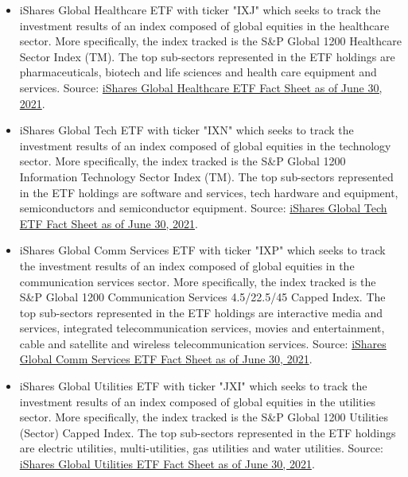 \begin{itemize}
        \item iShares Global Healthcare ETF with ticker "IXJ" which seeks to track the investment results of an index composed of global equities in the healthcare sector. More specifically, the index tracked is the S{\&}P Global 1200 Healthcare Sector Index (TM). The top sub-sectors represented in the ETF holdings are pharmaceuticals, biotech and life sciences and health care equipment and services. Source: \href{https://www.ishares.com/us/literature/fact-sheet/ixj-ishares-global-healthcare-etf-fund-fact-sheet-en-us.pdf}{iShares Global Healthcare ETF Fact Sheet as of June 30, 2021}.%
        
        \item iShares Global Tech ETF with ticker "IXN" which seeks to track the investment results of an index composed of global equities in the technology sector. More specifically, the index tracked is the S{\&}P Global 1200 Information Technology Sector Index (TM). The top sub-sectors represented in the ETF holdings are software and services, tech hardware and equipment, semiconductors and semiconductor equipment. Source: \href{https://www.ishares.com/us/literature/fact-sheet/ixn-ishares-global-tech-etf-fund-fact-sheet-en-us.pdf}{iShares Global Tech ETF Fact Sheet as of June 30, 2021}.%
        
        \item iShares Global Comm Services ETF with ticker "IXP" which seeks to track the investment results of an index composed of global equities in the communication services sector. More specifically, the index tracked is the S{\&}P Global 1200 Communication Services 4.5/22.5/45 Capped Index. The top sub-sectors represented in the ETF holdings are interactive media and services, integrated telecommunication services, movies and entertainment, cable and satellite and wireless telecommunication services. Source: \href{https://www.ishares.com/us/literature/fact-sheet/ixp-ishares-global-comm-services-etf-fund-fact-sheet-en-us.pdf}{iShares Global Comm Services ETF Fact Sheet as of June 30, 2021}.%
        
        \item iShares Global Utilities ETF with ticker "JXI" which seeks to track the investment results of an index composed of global equities in the utilities sector. More specifically, the index tracked is the S{\&}P Global 1200 Utilities (Sector) Capped Index. The top sub-sectors represented in the ETF holdings are electric utilities, multi-utilities, gas utilities and water utilities. Source: \href{https://www.ishares.com/us/literature/fact-sheet/jxi-ishares-global-utilities-etf-fund-fact-sheet-en-us.pdf}{iShares Global Utilities ETF Fact Sheet as of June 30, 2021}.%
        

\end{itemize}
